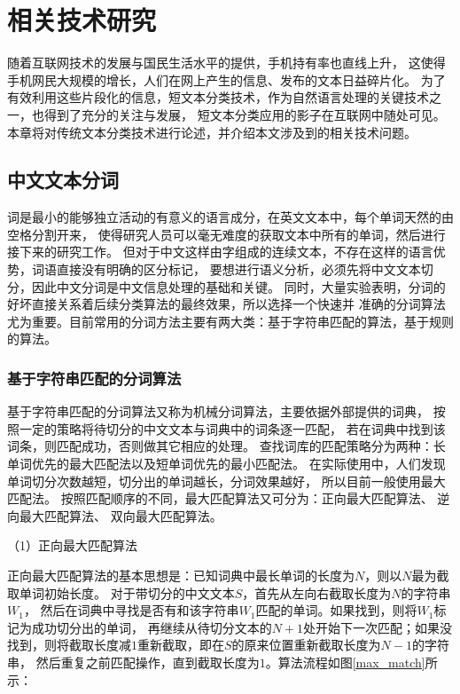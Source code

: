 \chapter{相关技术研究}
随着互联网技术的发展与国民生活水平的提供，手机持有率也直线上升，
这使得手机网民大规模的增长，人们在网上产生的信息、发布的文本日益碎片化。
为了有效利用这些片段化的信息，短文本分类技术，作为自然语言处理的关键技术之一，也得到了充分的关注与发展，
短文本分类应用的影子在互联网中随处可见。
本章将对传统文本分类技术进行论述，并介绍本文涉及到的相关技术问题。
\section{中文文本分词}
词是最小的能够独立活动的有意义的语言成分，在英文文本中，每个单词天然的由空格分割开来，
使得研究人员可以毫无难度的获取文本中所有的单词，然后进行接下来的研究工作。
但对于中文这样由字组成的连续文本，不存在这样的语言优势，词语直接没有明确的区分标记，
要想进行语义分析，必须先将中文文本切分，因此中文分词是中文信息处理的基础和关键。
同时，大量实验表明，分词的好坏直接关系着后续分类算法的最终效果，所以选择一个快速并
准确的分词算法尤为重要。目前常用的分词方法主要有两大类：基于字符串匹配的算法，基于规则的算法。
\subsection{基于字符串匹配的分词算法}
基于字符串匹配的分词算法又称为机械分词算法，主要依据外部提供的词典，
按照一定的策略将待切分的中文文本与词典中的词条逐一匹配，
若在词典中找到该词条，则匹配成功，否则做其它相应的处理。
查找词库的匹配策略分为两种：长单词优先的最大匹配法以及短单词优先的最小匹配法。
在实际使用中，人们发现单词切分次数越短，切分出的单词越长，分词效果越好，
所以目前一般使用最大匹配法。
按照匹配顺序的不同，最大匹配算法又可分为：正向最大匹配算法、
逆向最大匹配算法、
双向最大匹配算法。

（1）正向最大匹配算法

正向最大匹配算法的基本思想是：已知词典中最长单词的长度为$N$，则以$N$最为截取单词初始长度。
对于带切分的中文文本$S$，首先从左向右截取长度为$N$的字符串$W_{1}$，
然后在词典中寻找是否有和该字符串$W_{1}$匹配的单词。如果找到，则将$W_{1}$标记为成功切分出的单词，
再继续从待切分文本的$N+1$处开始下一次匹配；如果没找到，则将截取长度减$1$重新截取，即在$S$的原来位置重新截取长度为$N-1$的字符串，
然后重复之前匹配操作，直到截取长度为$1$。算法流程如图\ref{max_match}所示：

